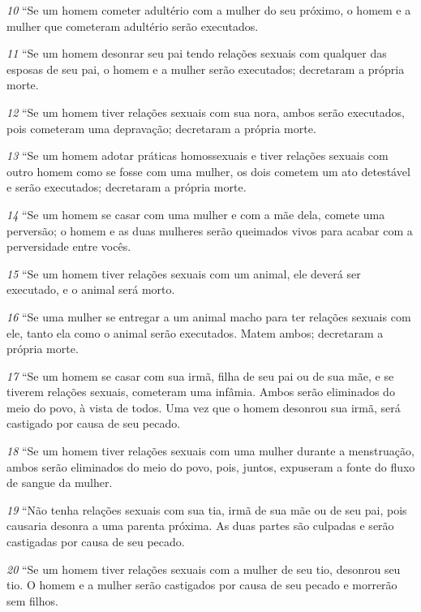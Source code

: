 \smallskip
\textit{\tiny 10}
“Se um homem cometer adultério com a mulher do seu próximo, o homem e
a mulher que cometeram adultério serão executados.
   
\smallskip
\textit{\tiny 11}
“Se um homem desonrar seu pai tendo relações sexuais com qualquer das
esposas de seu pai, o homem e a mulher serão executados; decretaram a própria
morte.
   
\smallskip
\textit{\tiny 12}
“Se um homem tiver relações sexuais com sua nora, ambos serão executados,
pois cometeram uma depravação; decretaram a própria morte.
  
\smallskip
\textit{\tiny 13}
“Se  um homem adotar práticas homossexuais e tiver relações sexuais com
outro homem como se fosse com uma mulher, os dois cometem um ato detestável
e serão executados; decretaram a própria morte.
   
\smallskip
\textit{\tiny 14}
“Se um homem se casar com uma mulher e com a mãe dela, comete uma
perversão; o homem e as duas mulheres serão queimados vivos para acabar com a
perversidade entre vocês.
   
\smallskip
\textit{\tiny 15}
“Se um homem tiver relações sexuais com um animal, ele deverá ser
executado, e o animal será morto.
   
\smallskip
\textit{\tiny 16}
“Se uma mulher se entregar a um animal macho para ter relações sexuais
com ele, tanto ela como o animal serão executados. Matem ambos; decretaram a
própria morte.
   
\smallskip
\textit{\tiny 17}
“Se um homem se casar com sua irmã, filha de seu pai ou de sua mãe, e se
tiverem relações sexuais, cometeram uma infâmia. Ambos serão eliminados do
meio do povo, à vista de todos. Uma vez que o homem desonrou sua irmã, será
castigado por causa de seu pecado.
   
\smallskip
\textit{\tiny 18}
“Se um homem tiver relações sexuais com uma mulher durante a
menstruação, ambos serão eliminados do meio do povo, pois, juntos, expuseram a
fonte do fluxo de sangue da mulher.
   
\smallskip
\textit{\tiny 19}
“Não tenha relações sexuais com sua tia, irmã de sua mãe ou de seu pai, pois
causaria desonra a uma parenta próxima. As duas partes são culpadas e serão
castigadas por causa de seu pecado.
   
\smallskip
\textit{\tiny 20}
“Se um homem tiver relações sexuais com a mulher de seu tio, desonrou seu
tio. O homem e a mulher serão castigados por causa de seu pecado e morrerão
sem filhos.
   
